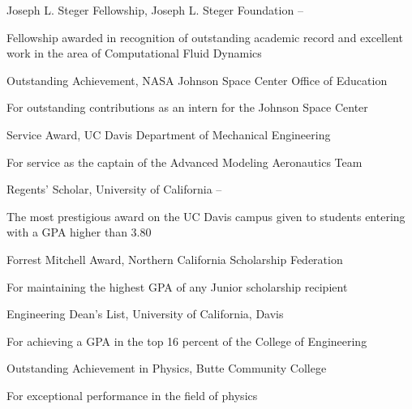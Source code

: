 \documentclass[letterpaper,MMMyyyy,nonstop]{simpleresumecv}
\begin{document}
\begin{body}
\BulletItem
Joseph L. Steger Fellowship,
Joseph L. Steger Foundation
\hfill
 --
\begin{detail}
\SubItem
Fellowship awarded in recognition of outstanding academic record and excellent work in the area of Computational Fluid Dynamics
\end{detail}

\Gap
\BulletItem
Outstanding Achievement,
NASA Johnson Space Center Office of Education
\hfill
\begin{detail}
\SubItem
For outstanding contributions as an intern for the Johnson Space Center
\end{detail}

\Gap
\BulletItem
Service Award,
UC Davis Department of Mechanical Engineering
\hfill
\begin{detail}
\SubItem
For service as the captain of the Advanced Modeling Aeronautics Team
\end{detail}

\Gap
\BulletItem
Regents' Scholar,
University of California
\hfill
{} --
\begin{detail}
\SubItem
The most prestigious award on the UC Davis campus given to students entering with a GPA higher than 3.80
\end{detail}

\Gap
\BulletItem
Forrest Mitchell Award,
Northern California Scholarship Federation
\hfill
{}
\begin{detail}
\SubItem
For maintaining the highest GPA of any Junior scholarship recipient
\end{detail}

\Gap
\BulletItem
Engineering Dean's List,
University of California, Davis
\hfill
{}
\begin{detail}
\SubItem
For achieving a GPA in the top 16 percent of the College of Engineering
\end{detail}

\Gap
\BulletItem
Outstanding Achievement in Physics,
Butte Community College
\hfill
{}
\begin{detail}
\SubItem
For exceptional performance in the field of physics
\end{detail}



\end{body}
\end{document}

